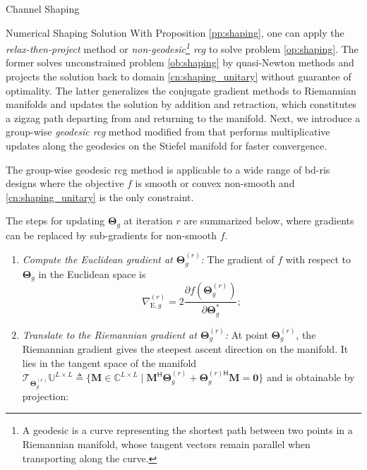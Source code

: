 \documentclass[journal]{IEEEtran}
\begin{document}
\begin{section}{Channel Shaping}
\begin{subsection}{Numerical Shaping Solution}
		With Proposition \ref{pp:shaping}, one can apply the \emph{relax-then-project} method \cite{Shen2020a,Fang2023} or \emph{non-geodesic\footnote{A geodesic is a curve representing the shortest path between two points in a Riemannian manifold, whose tangent vectors remain parallel when transporting along the curve.} \gls{rcg}} \cite{Li2023b,Li2023c,Zhou2023} to solve problem \eqref{op:shaping}.
		The former solves unconstrained problem \eqref{ob:shaping} by quasi-Newton methods and projects the solution back to domain \eqref{cn:shaping_unitary} without guarantee of optimality.
		The latter generalizes the conjugate gradient methods to Riemannian manifolds and updates the solution by addition and retraction, which constitutes a zigzag path departing from and returning to the manifold.
		Next, we introduce a group-wise \emph{geodesic \gls{rcg}} method modified from \cite{Abrudan2008,Abrudan2009} that performs multiplicative updates along the geodesics on the Stiefel manifold for faster convergence.
		\begin{remark}
			The group-wise geodesic \gls{rcg} method is applicable to a wide range of \gls{bd}-\gls{ris} designs where the objective $f$ is smooth or convex non-smooth and \eqref{cn:shaping_unitary} is the only constraint.
		\end{remark}
		The steps for updating $\mathbf{\Theta}_g$ at iteration $r$ are summarized below, where gradients can be replaced by sub-gradients for non-smooth $f$.
		\begin{enumerate}[label=(\roman*)]
			\item \emph{Compute the Euclidean gradient at $\mathbf{\Theta}_g^{(r)}$:} The gradient of $f$ with respect to $\mathbf{\Theta}_g$ in the Euclidean space is
				\begin{equation}
					\label{eq:gradient_eucl}
					\nabla_{\mathrm{E},g}^{(r)} = 2 \frac{\partial f(\mathbf{\Theta}_g^{(r)})}{\partial \mathbf{\Theta}_g^*};
				\end{equation}
			\item \emph{Translate to the Riemannian gradient at $\mathbf{\Theta}_g^{(r)}$:} At point $\mathbf{\Theta}_g^{(r)}$, the Riemannian gradient gives the steepest ascent direction on the manifold. It lies in the tangent space of the manifold $\mathcal{T}_{\mathbf{\Theta}_g^{(r)}}\mathbb{U}^{L \times L} \triangleq \{\mathbf{M} \in \mathbb{C}^{L \times L} \mid \mathbf{M}^\mathsf{H} \mathbf{\Theta}_g^{(r)} + {\mathbf{\Theta}_g^{(r)\mathsf{H}}} \mathbf{M} = \mathbf{0}\}$ and is obtainable by projection:

\end{enumerate}
\end{subsection}
\end{section}
\end{document}
